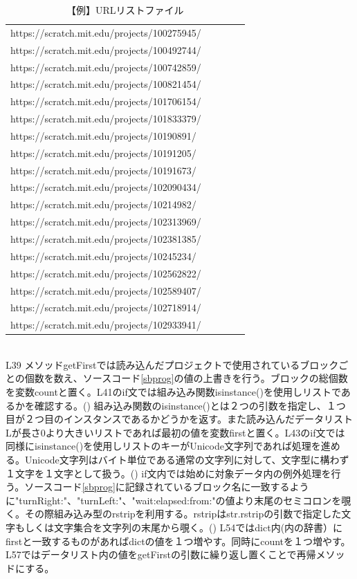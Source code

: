 \documentclass[a4paper,10pt,onecolumn,oneside,openany]{jsbook}
\begin{document}
\begin{table}[h]
 \caption{【例】URLリストファイル}
 \label{urllist}
 \begin{center}
\begin{tabular}{lclcl}
https://scratch.mit.edu/projects/100275945/ \\
https://scratch.mit.edu/projects/100492744/ \\
https://scratch.mit.edu/projects/100742859/ \\
https://scratch.mit.edu/projects/100821454/ \\
https://scratch.mit.edu/projects/101706154/ \\
https://scratch.mit.edu/projects/101833379/ \\
https://scratch.mit.edu/projects/10190891/ \\
https://scratch.mit.edu/projects/10191205/ \\
https://scratch.mit.edu/projects/10191673/ \\
https://scratch.mit.edu/projects/102090434/ \\
https://scratch.mit.edu/projects/10214982/ \\
https://scratch.mit.edu/projects/102313969/ \\
https://scratch.mit.edu/projects/102381385/ \\
https://scratch.mit.edu/projects/10245234/ \\
https://scratch.mit.edu/projects/102562822/ \\
https://scratch.mit.edu/projects/102589407/ \\
https://scratch.mit.edu/projects/102718914/ \\
https://scratch.mit.edu/projects/102933941/ \\
\end{tabular}
\end{center}
\end{table}
\\
L39 メソッドgetFirstでは読み込んだプロジェクトで使用されているブロックごとの個数を数え、ソースコード\ref{sbprog}の値の上書きを行う。ブロックの総個数を変数countと置く。L41のif文では組み込み関数isinstance()を使用しリストであるかを確認する。(\cite{isinstance}) 組み込み関数のisinstance()とは２つの引数を指定し、１つ目が２つ目のインスタンスであるかどうかを返す。また読み込んだデータリストLが長さ0より大きいリストであれば最初の値を変数firstと置く。L43のif文では同様にisinstance()を使用しリストのキーがUnicode文字列であれば処理を進める。Unicode文字列はバイト単位である通常の文字列に対して、文字型に構わず１文字を１文字として扱う。(\cite{unicode}) if文内では始めに対象データ内の例外処理を行う。ソースコード\ref{sbprog}に記録されているブロック名に一致するように"turnRight:"、"turnLeft:"、"wait:elapsed:from:"の値より末尾のセミコロンを覗く。その際組み込み型のrstripを利用する。rstripはstr.rstripの引数で指定した文字もしくは文字集合を文字列の末尾から覗く。(\cite{rstrip}) L54ではdict内(\cite{sbprog}内の辞書）にfirstと一致するものがあればdictの値を１つ増やす。同時にcountを１つ増やす。L57ではデータリスト内の値をgetFirstの引数に繰り返し置くことで再帰メソッドにする。
\end{document}
